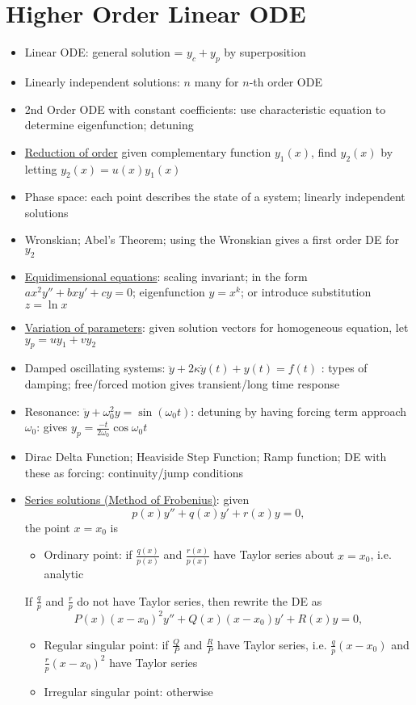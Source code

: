 \section{Higher Order Linear ODE}
\begin{itemize}
      \item Linear ODE: general solution = $y_c + y_p$ by superposition
      \item Linearly independent solutions: $n$ many for $n$-th order ODE
      \item 2nd Order ODE with constant coefficients: use characteristic equation to determine eigenfunction; detuning
      \item \underline{Reduction of order} given complementary function $y_1(x)$, find $y_2(x)$ by letting $y_2(x) = u(x)y_1(x)$
      \item Phase space: each point describes the state of a system; linearly independent solutions
      \item Wronskian; Abel's Theorem; using the Wronskian gives a first order DE for $y_2$
      \item \underline{Equidimensional equations}: scaling invariant; in the form $ax^2y'' + bxy' + cy = 0$; eigenfunction $y=x^k$; or introduce substitution $ z = \ln x$
      \item \underline{Variation of parameters}: given solution vectors for homogeneous equation, let $y_p=uy_1+vy_2$
      \item Damped oscillating systems: $\ddot{y} + 2\kappa \dot{y}(t) + y(t) = f(t)$ : types of damping; free/forced motion gives transient/long time response
      \item Resonance: $ \ddot{y} +\omega_0^2 y = \sin(\omega_0 t)$: detuning by having forcing term approach $\omega_0$: gives $y_p = \frac{-t}{2\omega_0}\cos\omega_0 t$
      \item Dirac Delta Function; Heaviside Step Function; Ramp function; DE with these as forcing: continuity/jump conditions

      \item \underline{Series solutions (Method of Frobenius)}: given \[p(x)y''+q(x)y'+r(x)y = 0,\] the point $x = x_0$ is

            \begin{itemize}
                  \item Ordinary point: if $\frac{q(x)}{p(x)}$ and $\frac{r(x)}{p(x)}$ have Taylor series about $x = x_0$, i.e. analytic
            \end{itemize}
            If $\frac{q}{p}$ and $\frac{r}{p}$ do not have Taylor series, then rewrite the DE as \[P(x)(x-x_0)^2y''+Q(x)(x-x_0)y'+R(x)y=0,\]
            \begin{itemize}
                  \item Regular singular point: if $\frac{Q}{P}$ and $\frac{R}{P}$ have Taylor series, i.e. $\frac{q}{p}(x-x_0)$ and $\frac{r}{p}(x-x_0)^2$ have Taylor series
                  \item Irregular singular point: otherwise
            \end{itemize}


\end{itemize}
